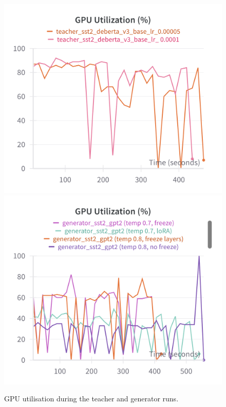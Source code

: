 \documentclass[11pt]{article}
\begin{document}
\begin{figure}[htbp]
  \centering
  \includegraphics[width=\linewidth]{figures/teacher_gpu_util.png}
  \endminipage\hfill
  \includegraphics[width=\linewidth]{figures/generator_gpu_util.png}
  \endminipage
  \caption{GPU utilisation during the teacher and generator runs. }
  \label{fig:sys-metrics}
\end{figure}
\end{document}
